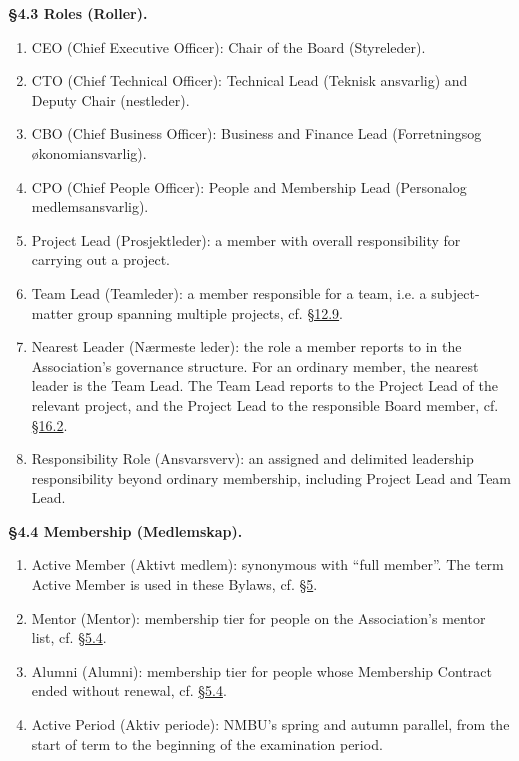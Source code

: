 \documentclass{../../../Common/Latex/Templates/rapport}
\begin{document}
\textbf{\S 4.3 Roles (Roller).}\label{bylaw:4.3}
\begin{enumerate}
  \item CEO (Chief Executive Officer): Chair of the Board (Styreleder).
  \item CTO (Chief Technical Officer): Technical Lead (Teknisk ansvarlig) and Deputy Chair (nestleder).
  \item CBO (Chief Business Officer): Business and Finance Lead (Forretningsog økonomiansvarlig).
  \item CPO (Chief People Officer): People and Membership Lead (Personalog medlemsansvarlig).
  \item Project Lead (Prosjektleder): a member with overall responsibility for carrying out a project.
  \item Team Lead (Teamleder): a member responsible for a team, i.e. a subject-matter group spanning multiple projects, cf. \hyperref[bylaw:12.9]{\S 12.9}.
  \item Nearest Leader (Nærmeste leder): the role a member reports to in the Association's governance structure. For an ordinary member, the nearest leader is the Team Lead. The Team Lead reports to the Project Lead of the relevant project, and the Project Lead to the responsible Board member, cf. \hyperref[bylaw:16.2]{\S 16.2}.
  \item Responsibility Role (Ansvarsverv): an assigned and delimited leadership responsibility beyond ordinary membership, including Project Lead and Team Lead.
\end{enumerate}

\textbf{\S 4.4 Membership (Medlemskap).}\label{bylaw:4.4}
\begin{enumerate}
  \item Active Member (Aktivt medlem): synonymous with ``full member''. The term Active Member is used in these Bylaws, cf. \hyperref[bylaw:5]{\S 5}.
  \item Mentor (Mentor): membership tier for people on the Association's mentor list, cf. \hyperref[bylaw:5.4]{\S 5.4}.
  \item Alumni (Alumni): membership tier for people whose Membership Contract ended without renewal, cf. \hyperref[bylaw:5.4]{\S 5.4}.
  \item Active Period (Aktiv periode): NMBU's spring and autumn parallel, from the start of term to the beginning of the examination period.
\end{enumerate}
\end{document}
